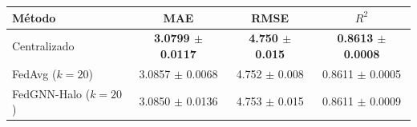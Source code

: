 
\begin{tabular}{lccc}
\toprule
Método & MAE & RMSE & $R^2$ \\
\midrule
Centralizado & \textbf{\boldmath\sisetup{mode=text,detect-weight=true}\num{3.0799} $\pm$ \num{0.0117}} & \textbf{\boldmath\sisetup{mode=text,detect-weight=true}\num{4.750} $\pm$ \num{0.015}} & \textbf{\boldmath\sisetup{mode=text,detect-weight=true}\num{0.8613} $\pm$ \num{0.0008}} \\
FedAvg ($k=20$) & \num{3.0857} $\pm$ \num{0.0068} & \num{4.752} $\pm$ \num{0.008} & \num{0.8611} $\pm$ \num{0.0005} \\
FedGNN-Halo ($k=20$) & \num{3.0850} $\pm$ \num{0.0136} & \num{4.753} $\pm$ \num{0.015} & \num{0.8611} $\pm$ \num{0.0009} \\
\bottomrule
\end{tabular}
